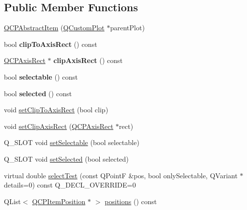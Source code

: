 \subsection*{Public Member Functions}
\begin{DoxyCompactItemize}
\item 
\hyperlink{class_q_c_p_abstract_item_a9922507d8b4503a1fe1ed0b1030e23b6}{Q\+C\+P\+Abstract\+Item} (\hyperlink{class_q_custom_plot}{Q\+Custom\+Plot} $\ast$parent\+Plot)
\item 
\mbox{\label{class_q_c_p_abstract_item_a42715ad5f3d7fca6854025fa5636f436}} 
bool {\bfseries clip\+To\+Axis\+Rect} () const
\item 
\mbox{\label{class_q_c_p_abstract_item_ae162314efd3fe1a6d4df11da1d275d52}} 
\hyperlink{class_q_c_p_axis_rect}{Q\+C\+P\+Axis\+Rect} $\ast$ {\bfseries clip\+Axis\+Rect} () const
\item 
\mbox{\label{class_q_c_p_abstract_item_ae29aa489767352b40c4aaa7ea50c5582}} 
bool {\bfseries selectable} () const
\item 
\mbox{\label{class_q_c_p_abstract_item_aa069fba320a13639f119f82ad29ead96}} 
bool {\bfseries selected} () const
\item 
void \hyperlink{class_q_c_p_abstract_item_a39e05b9d4176b9accafc746d16ca6a06}{set\+Clip\+To\+Axis\+Rect} (bool clip)
\item 
void \hyperlink{class_q_c_p_abstract_item_a7dc75fcbcd10206fe0b75d757ea7a347}{set\+Clip\+Axis\+Rect} (\hyperlink{class_q_c_p_axis_rect}{Q\+C\+P\+Axis\+Rect} $\ast$rect)
\item 
Q\+\_\+\+S\+L\+OT void \hyperlink{class_q_c_p_abstract_item_a8a8e32a55bc478b849756a78c2d87fd2}{set\+Selectable} (bool selectable)
\item 
Q\+\_\+\+S\+L\+OT void \hyperlink{class_q_c_p_abstract_item_a203de94ad586cc44d16c9565f49d3378}{set\+Selected} (bool selected)
\item 
virtual double \hyperlink{class_q_c_p_abstract_item_ae41d0349d68bb802c49104afd100ba2a}{select\+Test} (const Q\+PointF \&pos, bool only\+Selectable, Q\+Variant $\ast$details=0) const Q\+\_\+\+D\+E\+C\+L\+\_\+\+O\+V\+E\+R\+R\+I\+DE=0
\item 
Q\+List$<$ \hyperlink{class_q_c_p_item_position}{Q\+C\+P\+Item\+Position} $\ast$ $>$ \hyperlink{class_q_c_p_abstract_item_a709f655ac3f7f22d452714134662b454}{positions} () const

\end{DoxyCompactItemize}
